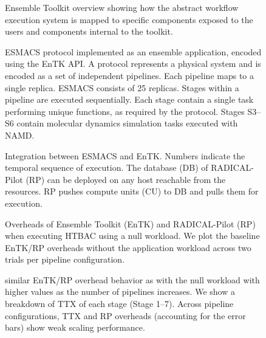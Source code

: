 \documentclass{bmcart}
\begin{document}
\begin{figure}[h!]
\caption{
  Ensemble Toolkit overview showing how the abstract
  workflow execution system is mapped to specific components exposed
  to the users and components internal to the toolkit.}
  \label{fig:entk_arch}
  \end{figure}


\begin{figure}[h!]
\caption{
  ESMACS protocol implemented as an ensemble application, encoded
  using the EnTK API\@. A protocol represents a physical system and is
  encoded as a set of independent pipelines. Each pipeline maps to a single
  replica. ESMACS consists of 25 replicas. Stages within a pipeline are
  executed sequentially. Each stage contain a single task performing unique
  functions, as required by the protocol. Stages S3--S6 contain molecular
  dynamics simulation tasks executed with NAMD\@.}
  \label{figure:HTBAC}
  \end{figure}

\begin{figure}[h!]
\caption{
  Integration between ESMACS and EnTK\@. Numbers indicate
  the temporal sequence of execution. The database (DB) of RADICAL-Pilot (RP)
  can be deployed on any host reachable from the resources. RP pushes compute
  units (CU) to DB and pulls them for execution.}
  \label{figure:ht-bac_rp}
  \end{figure}


\begin{figure}[h!]
\caption{
  Overheads of Ensemble Toolkit (EnTK) and RADICAL-Pilot (RP) when
  executing HTBAC using a null workload. We plot the baseline
  EnTK/RP overheads without the application workload across two
  trials per pipeline configuration.}\label{fig:exp1}
  \end{figure}


\begin{figure}[h!]
\caption{
  similar EnTK/RP overhead behavior as with the null workload with higher
  values as the number of pipelines increases. We show a breakdown of TTX of
  each stage (Stage 1--7). Across pipeline configurations, TTX and RP
  overheads (accounting for the error bars) show weak scaling
  performance.}
  \label{fig:exp2}
  \end{figure}
\end{document}
